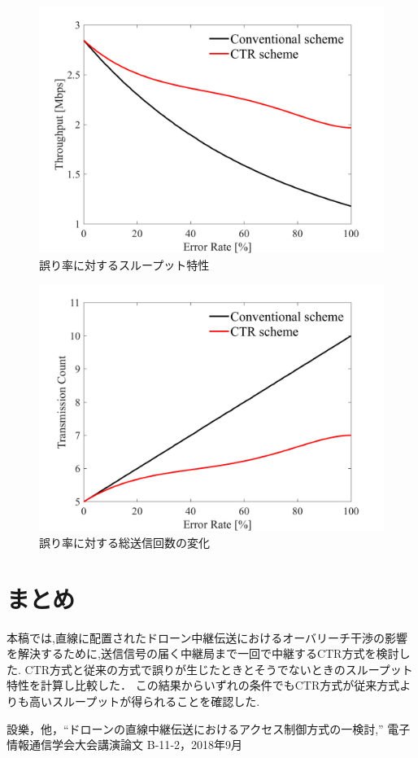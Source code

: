\documentclass[a4paper,10pt]{ltjsarticle}
\begin{document}
\begin{figure}[H]
  \centering
  \includegraphics[width=\linewidth]{throughput_probabilistic_retry_v3.pdf} %
  \caption{誤り率に対するスループット特性}
  \label{fig:throughput_v3} %
\end{figure}
\begin{figure}[H]
  \centering
  \includegraphics[width=\linewidth]{throughput_probabilistic_retry_v3.1.pdf} %
  \caption{誤り率に対する総送信回数の変化}
  \label{fig:throughput_v3.1} %
\end{figure}

\section{まとめ}
本稿では,直線に配置されたドローン中継伝送におけるオーバリーチ干渉の影響を解決するために,送信信号の届く中継局まで一回で中継するCTR方式を検討した.
CTR方式と従来の方式で誤りが生じたときとそうでないときのスループット特性を計算し比較した．
この結果からいずれの条件でもCTR方式が従来方式よりも高いスループットが得られることを確認した.

\begin{thebibliography}{99}
  設樂，他，“ドローンの直線中継伝送におけるアクセス制御方式の一検討,” 電子情報通信学会大会講演論文 B‐11‐2，2018年9月
\end{thebibliography}

%
\end{document}
